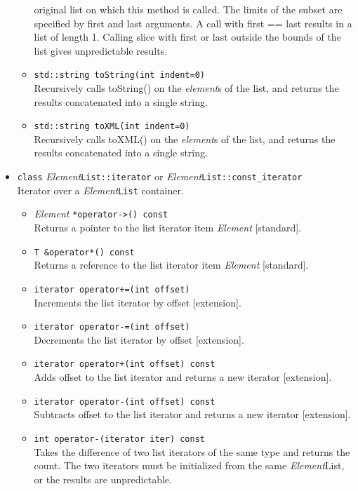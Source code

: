 \documentclass{revtex4}
\begin{document}
\begin{itemize}
\begin{itemize}
original list on which this method is called. The limits of the subset are
specified by first and last arguments. A call with first == last results in a
list of length 1. Calling slice with first or last outside the bounds of the
list gives unpredictable results.
\item \texttt{std::string toString(int indent=0)}\\
Recursively calls toString() on the {\em element}s of the list, and returns the
results concatenated into a single string.
\item \texttt{std::string toXML(int indent=0)}\\
Recursively calls toXML() on the {\em element}s of the list, and returns the
results concatenated into a single string.
\end{itemize}

\item \texttt{class} {\em Element}\texttt{List::iterator} or {\em Element}\texttt{List::const\_iterator}\\
Iterator over a {\em Element}\texttt{List} container.
\begin{itemize}
\item {\em Element} \texttt{*operator->() const}\\
Returns a pointer to the list iterator item {\em Element} [standard].
\item \texttt{T \&operator*() const}\\
Returns a reference to the list iterator item {\em Element} [standard].
\item \texttt{iterator operator+=(int offset)}\\
Increments the list iterator by offset [extension].
\item \texttt{iterator operator-=(int offset)}\\
Decrements the list iterator by offset [extension].
\item \texttt{iterator operator+(int offset) const}\\
Adds offset to the list iterator and returns a new iterator [extension].
\item \texttt{iterator operator-(int offset) const}\\
Subtracts offset to the list iterator and returns a new iterator [extension].
\item \texttt{int operator-(iterator iter) const}\\
Takes the difference of two list iterators of the same type and returns the
count. The two iterators must be initialized from the same {\em Element}List,
or the results are unpredictable.
\end{itemize}


\end{itemize}
\end{document}
